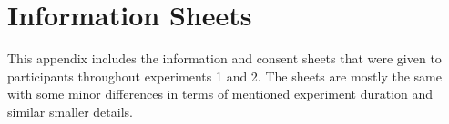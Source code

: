\chapter{Information Sheets}\label{app:informationconsent}
This appendix includes the information and consent sheets that were given to participants throughout experiments 1 and 2. The sheets are mostly the same with some minor differences in terms of mentioned experiment duration and similar smaller details.  


